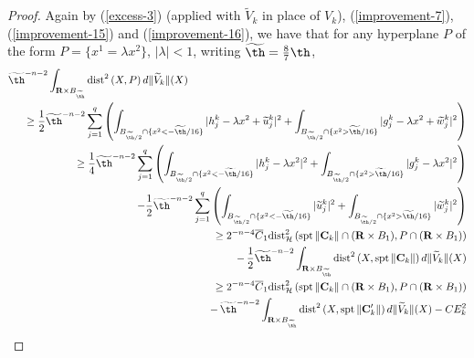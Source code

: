 \documentclass[a4paper,11pt]{amsart}
\begin{document}
\begin{proof}
Again by (\ref{excess-3}) (applied with $\widetilde{V}_{k}$ in place of $V_{k}$), (\ref{improvement-7}),  (\ref{improvement-15}) and (\ref{improvement-16}), we have that for any hyperplane $P$ of the form $P = \{x^{1} = \lambda x^{2}\}$, $|\lambda| < 1$, writing $\widetilde{\th} = \frac{8}{7}\th$, 
\begin{eqnarray*}
\widetilde{\th}^{-n-2}\int_{{\mathbf R} \times B_{\widetilde{\th}}} {\rm dist}^{2}\,(X, P) \, d\|\widetilde{V}_{k}\|(X)&&\nonumber\\ 
&&\hspace{-2.25in}\geq \frac{1}{2}\widetilde{\th}^{-n-2}\sum_{j=1}^{q}\left(\int_{B_{\widetilde{\th}/2}\cap \{x^{2} < -\widetilde{\th}/16\}} |h_{j}^{k}  - \lambda x^{2}+ \widetilde{u}_{j}^{k}|^{2}  + \int_{B_{\widetilde{\th}/2} \cap  
\{x^{2} > \widetilde{\th}/16\}} |g_{j}^{k} - \lambda x^{2}  + \widetilde{w}_{j}^{k}|^{2}\right) \nonumber\\
&&\hspace{-2.25in}\geq \frac{1}{4}\widetilde{\th}^{-n-2}\sum_{j=1}^{q}\left(\int_{B_{\widetilde{\th}/2} \cap \{x^{2} < -\widetilde{\th}/16\}} |h_{j}^{k} - \lambda x^{2}|^{2} + \int_{B_{\widetilde{\th}/2} \cap \{x^{2} > \widetilde{\th}/16\}}|g_{j}^{k} - \lambda x^{2}|^{2}\right)\nonumber\\ 
&&\hspace{-1in}-\frac{1}{2}\widetilde{\th}^{-n-2}\sum_{j=1}^{q}\left(\int_{B_{\widetilde{\th}/2}\cap \{x^{2} < -\widetilde{\th}/16\}} |\widetilde{u}_{j}^{k}|^{2}  + \int_{B_{\widetilde{\th}/2} \cap \{x^{2} > \widetilde{\th}/16\}} |\widetilde{w}_{j}^{k}|^{2}\right)\nonumber\\
&&\hspace{-2.25in} \geq 2^{-n-4}\overline{C}_{1}{\rm dist}_{\mathcal H}^{2} \, ({\rm spt} \, \|{\mathbf C}_{k} \| \cap ({\mathbf R} \times B_{1}), P \cap ({\mathbf R} \times  B_{1}))\nonumber\\
&&- \,\frac{1}{2}\widetilde{\th}^{-n-2}\int_{{\mathbf R} \times B_{\widetilde{\th}}}{\rm dist}^{2} \, (X, {\rm spt} \, \|{\mathbf C}_{k}\|) \, d\|\widetilde{V}_{k}\|(X)\nonumber\\
&&\hspace{-2.25in} \geq 2^{-n-4}\overline{C}_{1}{\rm dist}_{\mathcal H}^{2} \, ({\rm spt} \, \|{\mathbf C}_{k} \| \cap ({\mathbf R} \times B_{1}), P \cap ({\mathbf R} \times B_{1}))\nonumber\\
&&- \,\widetilde{\th}^{-n-2}\int_{{\mathbf R} \times B_{\widetilde{\th}}}{\rm dist}^{2} \, (X, {\rm spt} \, \|{\mathbf C}_{k}^{\prime}\|) \, d\|\widetilde{V}_{k}\|(X) - CE_{k}^{2}\nonumber\\

\end{eqnarray*}
\end{proof}
\end{document}

